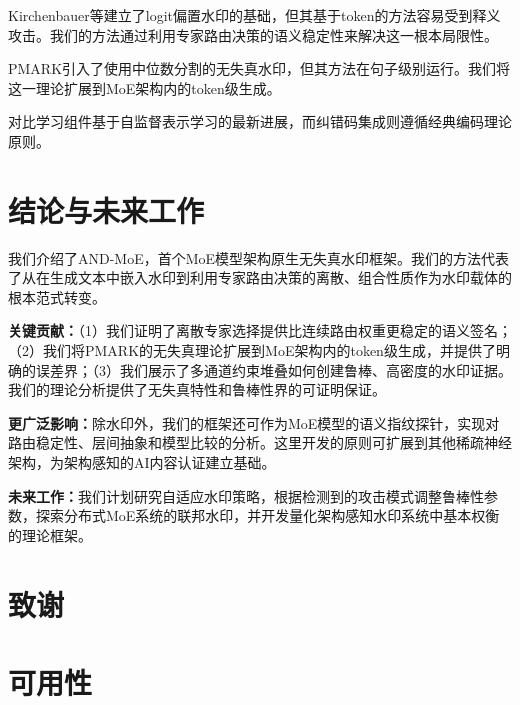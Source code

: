 \documentclass[letterpaper,twocolumn,10pt]{article}
\begin{document}
Kirchenbauer等\cite{kirchenbauer2023watermark}建立了logit偏置水印的基础，但其基于token的方法容易受到释义攻击。我们的方法通过利用专家路由决策的语义稳定性来解决这一根本局限性。

PMARK\cite{pmark2024}引入了使用中位数分割的无失真水印，但其方法在句子级别运行。我们将这一理论扩展到MoE架构内的token级生成。

对比学习组件基于自监督表示学习的最新进展\cite{chen2020simple}，而纠错码集成则遵循经典编码理论原则\cite{macwilliams1977theory}。

\section{结论与未来工作}

我们介绍了AND-MoE，首个MoE模型架构原生无失真水印框架。我们的方法代表了从在生成文本中嵌入水印到利用专家路由决策的离散、组合性质作为水印载体的根本范式转变。

\textbf{关键贡献：}（1）我们证明了离散专家选择提供比连续路由权重更稳定的语义签名；（2）我们将PMARK的无失真理论扩展到MoE架构内的token级生成，并提供了明确的误差界；（3）我们展示了多通道约束堆叠如何创建鲁棒、高密度的水印证据。我们的理论分析提供了无失真特性和鲁棒性界的可证明保证。

\textbf{更广泛影响：}除水印外，我们的框架还可作为MoE模型的语义指纹探针，实现对路由稳定性、层间抽象和模型比较的分析。这里开发的原则可扩展到其他稀疏神经架构，为架构感知的AI内容认证建立基础。

\textbf{未来工作：}我们计划研究自适应水印策略，根据检测到的攻击模式调整鲁棒性参数，探索分布式MoE系统的联邦水印，并开发量化架构感知水印系统中基本权衡的理论框架。

\section*{致谢}


\section*{可用性}
\end{document}
